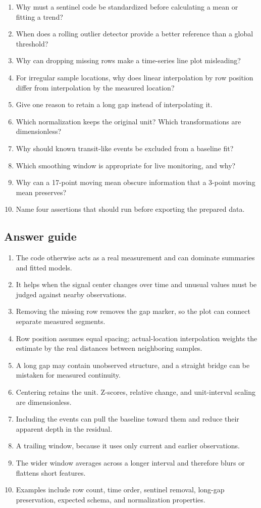 \documentclass[11pt,letterpaper]{article}
\begin{document}
\begin{enumerate}
\item Why must a sentinel code be standardized before calculating a mean or
fitting a trend?
\item When does a rolling outlier detector provide a better reference than a
global threshold?
\item Why can dropping missing rows make a time-series line plot misleading?
\item For irregular sample locations, why does linear interpolation by row
position differ from interpolation by the measured location?
\item Give one reason to retain a long gap instead of interpolating it.
\item Which normalization keeps the original unit? Which transformations are
dimensionless?
\item Why should known transit-like events be excluded from a baseline fit?
\item Which smoothing window is appropriate for live monitoring, and why?
\item Why can a 17-point moving mean obscure information that a 3-point moving
mean preserves?
\item Name four assertions that should run before exporting the prepared data.
\end{enumerate}

\subsection*{Answer guide}

\begin{enumerate}
\item The code otherwise acts as a real measurement and can dominate summaries
and fitted models.
\item It helps when the signal center changes over time and unusual values must
be judged against nearby observations.
\item Removing the missing row removes the gap marker, so the plot can connect
separate measured segments.
\item Row position assumes equal spacing; actual-location interpolation weights
the estimate by the real distances between neighboring samples.
\item A long gap may contain unobserved structure, and a straight bridge can be
mistaken for measured continuity.
\item Centering retains the unit. Z-scores, relative change, and unit-interval
scaling are dimensionless.
\item Including the events can pull the baseline toward them and reduce their
apparent depth in the residual.
\item A trailing window, because it uses only current and earlier observations.
\item The wider window averages across a longer interval and therefore blurs or
flattens short features.
\item Examples include row count, time order, sentinel removal, long-gap
preservation, expected schema, and normalization properties.
\end{enumerate}
\end{document}
